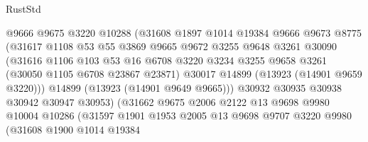 \begin{lexlean}{RustStd}
\begin{coremodule}
                            @9666
                            @9675
                            @3220
                            @10288
                            (@31608
                              @1897
                              @1014
                              @19384
                              @9666
                              @9673
                              @8775
                              (@31617
                                @1108
                                @53
                                @55
                                @3869
                                @9665
                                @9672
                                @3255
                                @9648
                                @3261
                                @30090
                                (@31616
                                  @1106
                                  @103
                                  @53
                                  @16
                                  @6708
                                  @3220
                                  @3234
                                  @3255
                                  @9658
                                  @3261
                                  (@30050 @1105 @6708 @23867 @23871)
                                  @30017
                                  @14899
                                  (@13923 (@14901 @9659 @3220)))
                                @14899
                                (@13923 (@14901 @9649 @9665)))
                              @30932
                              @30935
                              @30938
                              @30942
                              @30947
                              @30953)
                            (@31662
                              @9675
                              @2006
                              @2122
                              @13
                              @9698
                              @9980
                              @10004
                              @10286
                              (@31597
                                @1901
                                @1953
                                @2005
                                @13
                                @9698
                                @9707
                                @3220
                                @9980
                                (@31608
                                  @1900
                                  @1014
                                  @19384

\end{coremodule}
\end{lexlean}
